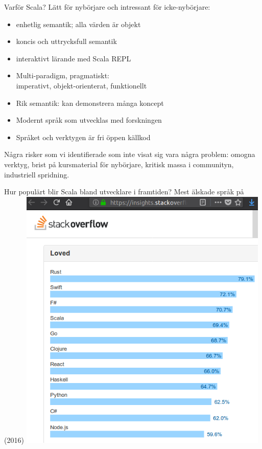 \begin{Slide}{Varför Scala?}
Lätt för nybörjare och intressant för icke-nybörjare:
\begin{itemize}
\item enhetlig semantik; alla värden är objekt
\item koncis och uttrycksfull semantik
\item interaktivt lärande med Scala REPL
\item Multi-paradigm, pragmatiskt: \\ imperativt, objekt-orienterat, funktionellt
\item Rik semantik: kan demonstrera många koncept
\item Modernt språk som utvecklas med forskningen
\item Språket och verktygen är fri öppen källkod
\end{itemize}
\pause Några risker som vi identifierade som inte visat sig vara några problem: omogna verktyg, brist på kursmaterial för nybörjare, kritisk massa i communityn, industriell spridning.
\end{Slide}



\begin{Slide}{Hur populärt blir Scala bland utvecklare i framtiden?}
Mest älskade språk på  (2016)
\includegraphics[width=0.9\textwidth]{../img/w14/most-loved-2016.png}
\end{Slide}

